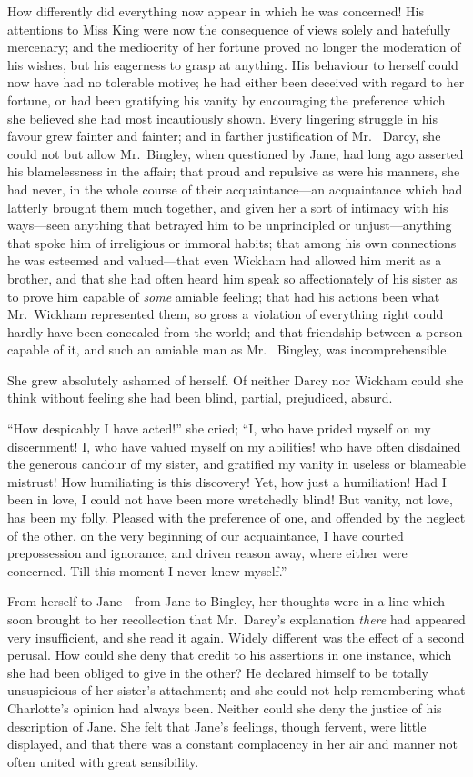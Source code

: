 How differently did everything now appear in which he was
concerned!  His attentions to Miss King were now the consequence
of views solely and hatefully mercenary; and the mediocrity of
her fortune proved no longer the moderation of his wishes, but
his eagerness to grasp at anything.  His behaviour to herself
could now have had no tolerable motive; he had either been
deceived with regard to her fortune, or had been gratifying his
vanity by encouraging the preference which she believed she had
most incautiously shown.  Every lingering struggle in his favour
grew fainter and fainter; and in farther justification of Mr.\ %
Darcy, she could not but allow Mr.\ Bingley, when questioned
by Jane, had long ago asserted his blamelessness in the affair;
that proud and repulsive as were his manners, she had never, in
the whole course of their acquaintance---an acquaintance which
had latterly brought them much together, and given her a sort of
intimacy with his ways---seen anything that betrayed him to be
unprincipled or unjust---anything that spoke him of irreligious
or immoral habits; that among his own connections he was
esteemed and valued---that even Wickham had allowed him
merit as a brother, and that she had often heard him speak so
affectionately of his sister as to prove him capable of \emph{some}
amiable feeling; that had his actions been what Mr.\ Wickham
represented them, so gross a violation of everything right could
hardly have been concealed from the world; and that friendship
between a person capable of it, and such an amiable man as Mr.\ %
Bingley, was incomprehensible.

She grew absolutely ashamed of herself.  Of neither Darcy nor
Wickham could she think without feeling she had been blind,
partial, prejudiced, absurd.

``How despicably I have acted!'' she cried; ``I, who have prided
myself on my discernment!  I, who have valued myself on my
abilities!  who have often disdained the generous candour of my
sister, and gratified my vanity in useless or blameable mistrust!
How humiliating is this discovery!  Yet, how just a humiliation!
Had I been in love, I could not have been more wretchedly blind!
But vanity, not love, has been my folly.  Pleased with the
preference of one, and offended by the neglect of the other,
on the very beginning of our acquaintance, I have courted
prepossession and ignorance, and driven reason away, where
either were concerned.  Till this moment I never knew myself.''

From herself to Jane---from Jane to Bingley, her thoughts were
in a line which soon brought to her recollection that Mr.\ Darcy's
explanation \emph{there} had appeared very insufficient, and she read
it again.  Widely different was the effect of a second perusal.
How could she deny that credit to his assertions in one instance,
which she had been obliged to give in the other?  He declared
himself to be totally unsuspicious of her sister's attachment;
and she could not help remembering what Charlotte's opinion
had always been.  Neither could she deny the justice of his
description of Jane.  She felt that Jane's feelings, though fervent,
were little displayed, and that there was a constant complacency
in her air and manner not often united with great sensibility.


